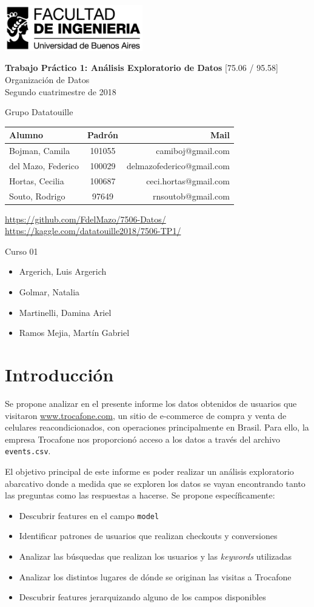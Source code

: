 \documentclass[a4paper]{article}
\makeatletter
\newcommand{\materia}{[75.06 / 95.58] Organización de Datos}
\newcommand{\trabajo}{Trabajo Práctico 1: Análisis Exploratorio de Datos}
\newcommand{\cuatrimestre}{Segundo cuatrimestre de 2018}
\newcommand{\grupo}{Grupo Datatouille}
\newcommand{\repo}{https://github.com/FdelMazo/7506-Datos/}
\newcommand{\kernel}{https://kaggle.com/datatouille2018/7506-TP1/}
\newcommand{\alumnos}{
    Bojman, Camila & 101055 &  camiboj@gmail.com\\
    del Mazo, Federico & 100029 & delmazofederico@gmail.com\\
    Hortas, Cecilia & 100687 & ceci.hortas@gmail.com\\
    Souto, Rodrigo & 97649 & rnsoutob@gmail.com\\
}
\newcommand{\curso}{Curso 01}
\newcommand{\docentes}{
    \item Argerich, Luis Argerich
    \item Golmar, Natalia
    \item Martinelli, Damina Ariel
    \item Ramos Mejia, Martín Gabriel
}
\makeatother
\begin{document}

\begin{titlepage}
	\hfill\includegraphics[width=6cm]{fiuba.jpg}
    \begin{center}
    \vfill
    \Huge \textbf{\trabajo}
    \vskip2cm
    \Large \materia\\
    \cuatrimestre
    \vfill
    \begin{flushleft} 
    \grupo
    \end{flushleft}
    \begin{tabular}{|l|c|r|}
	\hline
	Alumno & Padrón & Mail\\
	\hline \hline
    \alumnos
	\hline
	\end{tabular}
    \begin{flushleft} 
    \url{\repo} \\
    \url{\kernel}
    \end{flushleft}
    \vskip1cm
    \end{center}
    \curso
    \begin{itemize}
        \docentes
    \end{itemize}
\end{titlepage}
\tableofcontents
\newpage
{}
\setcounter{page}{1}

\section{Introducción}

Se propone analizar en el presente informe los datos obtenidos de usuarios que visitaron \url{www.trocafone.com}, un sitio de e-commerce de compra y venta de celulares reacondicionados, con operaciones principalmente en Brasil. Para ello, la empresa Trocafone nos proporcionó acceso a los datos a través del archivo \texttt{events.csv}. 

El objetivo principal de este informe es poder realizar un análisis exploratorio abarcativo donde a medida que se exploren los datos se vayan encontrando tanto las preguntas como las respuestas a hacerse. Se propone específicamente:
 
 \begin{itemize}
	 \item Descubrir features en el campo \texttt{model}
	 \item Identificar patrones de usuarios que realizan checkouts y conversiones
	 \item Analizar las búsquedas que realizan los usuarios y las \textit{keywords} utilizadas
	 \item Analizar los distintos lugares de dónde se originan las visitas a Trocafone
	 \item Descubrir features jerarquizando alguno de los campos disponibles
\end{itemize}
\end{document}
